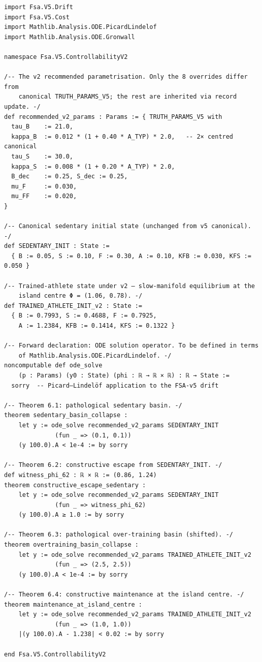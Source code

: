 \documentclass[11pt,a4paper]{article}
\theoremstyle{definition}
\begin{document}
\begin{lstlisting}[language={}]
import Fsa.V5.Drift
import Fsa.V5.Cost
import Mathlib.Analysis.ODE.PicardLindelof
import Mathlib.Analysis.ODE.Gronwall

namespace Fsa.V5.ControllabilityV2

/-- The v2 recommended parametrisation. Only the 8 overrides differ from
    canonical TRUTH_PARAMS_V5; the rest are inherited via record update. -/
def recommended_v2_params : Params := { TRUTH_PARAMS_V5 with
  tau_B    := 21.0,
  kappa_B  := 0.012 * (1 + 0.40 * A_TYP) * 2.0,   -- 2× centred canonical
  tau_S    := 30.0,
  kappa_S  := 0.008 * (1 + 0.20 * A_TYP) * 2.0,
  B_dec    := 0.25, S_dec := 0.25,
  mu_F     := 0.030,
  mu_FF    := 0.020,
}

/-- Canonical sedentary initial state (unchanged from v5 canonical). -/
def SEDENTARY_INIT : State :=
  { B := 0.05, S := 0.10, F := 0.30, A := 0.10, KFB := 0.030, KFS := 0.050 }

/-- Trained-athlete state under v2 — slow-manifold equilibrium at the
    island centre Φ = (1.06, 0.78). -/
def TRAINED_ATHLETE_INIT_v2 : State :=
  { B := 0.7993, S := 0.4688, F := 0.7925,
    A := 1.2384, KFB := 0.1414, KFS := 0.1322 }

/-- Forward declaration: ODE solution operator. To be defined in terms
    of Mathlib.Analysis.ODE.PicardLindelof. -/
noncomputable def ode_solve
    (p : Params) (y0 : State) (phi : ℝ → ℝ × ℝ) : ℝ → State :=
  sorry  -- Picard–Lindelöf application to the FSA-v5 drift

/-- Theorem 6.1: pathological sedentary basin. -/
theorem sedentary_basin_collapse :
    let y := ode_solve recommended_v2_params SEDENTARY_INIT
              (fun _ => (0.1, 0.1))
    (y 100.0).A < 1e-4 := by sorry

/-- Theorem 6.2: constructive escape from SEDENTARY_INIT. -/
def witness_phi_62 : ℝ × ℝ := (0.86, 1.24)
theorem constructive_escape_sedentary :
    let y := ode_solve recommended_v2_params SEDENTARY_INIT
              (fun _ => witness_phi_62)
    (y 100.0).A ≥ 1.0 := by sorry

/-- Theorem 6.3: pathological over-training basin (shifted). -/
theorem overtraining_basin_collapse :
    let y := ode_solve recommended_v2_params TRAINED_ATHLETE_INIT_v2
              (fun _ => (2.5, 2.5))
    (y 100.0).A < 1e-4 := by sorry

/-- Theorem 6.4: constructive maintenance at the island centre. -/
theorem maintenance_at_island_centre :
    let y := ode_solve recommended_v2_params TRAINED_ATHLETE_INIT_v2
              (fun _ => (1.0, 1.0))
    |(y 100.0).A - 1.238| < 0.02 := by sorry

end Fsa.V5.ControllabilityV2
\end{lstlisting}
\end{document}
